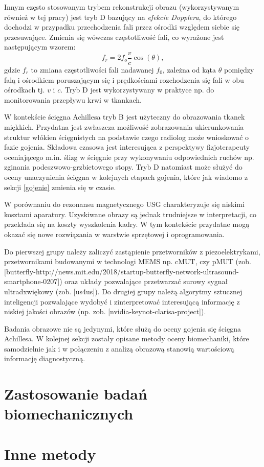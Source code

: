Innym często stosowanym trybem rekonstrukcji obrazu (wykorzystywanym również w tej pracy) jest tryb D bazujący na \textit{efekcie Dopplera}, do którego dochodzi w przypadku przechodzenia fali przez ośrodki względem siebie się przesuwające. Zmienia się wówczas częstotliwość fali, co wyrażone jest następującym wzorem:
\begin{equation}
f_r = 2 f_o\frac{v}{c}\cos(\theta),
\end{equation} 
gdzie $f_r$ to zmiana częstotliwości fali nadawanej $f_0$, zależna od kąta $\theta$ pomiędzy falą i ośrodkiem poruszającym się i prędkościami rozchodzenia się fali w obu ośrodkach tj. $v$ i $c$. Tryb D jest wykorzystywany w praktyce np. do monitorowania przepływu krwi w tkankach. 

W kontekście ścięgna Achillesa tryb B jest użyteczny do obrazowania tkanek miękkich. Przydatna jest zwłaszcza możliwość zobrazowania ukierunkowania struktur włókien ścięgnistych na podstawie czego radiolog może wnioskować o fazie gojenia. Składowa czasowa jest interesująca z perspektywy fizjoterapeuty oceniającego m.in. ślizg w ścięgnie przy wykonywaniu odpowiednich ruchów np. zginania podeszwowo-grzbietowego stopy. Tryb D natomiast może służyć do oceny unaczynienia ścięgna w kolejnych etapach gojenia, które jak wiadomo z sekcji \ref{gojenie} zmienia się w czasie.

W porównaniu do rezonansu magnetycznego USG charakteryzuje się niskimi kosztami aparatury. Uzyskiwane obrazy są jednak trudniejsze w interpretacji, co przekłada się na koszty wyszkolenia kadry. W tym kontekście przydatne mogą okazać się nowe rozwiązania w warstwie sprzętowej i oprogramowania. 

Do pierwszej grupy należy zaliczyć zastąpienie przetworników z piezoelektrykami, przetwornikami budowanymi w technologi MEMS np. cMUT, czy pMUT (zob. [butterfly-http://news.mit.edu/2018/startup-butterfly-network-ultrasound-smartphone-0207]) oraz układy pozwalające przetwarzać surowy sygnał ultradxwiękowy (zob. [us4us]). Do drugiej grupy należą algorytmy sztucznej inteligencji pozwalające wydobyć i zinterpretować interesującą informację z niskiej jakości obrazów (np. zob. [nvidia-keynot-clarisa-project]). 

Badania obrazowe nie są jedynymi, które służą do oceny gojenia się ścięgna Achillesa. W kolejnej sekcji zostały opisane metody oceny biomechaniki, które samodzielnie jak i w połączeniu z analizą obrazową stanowią wartościową informację diagnostyczną.

\section{Zastosowanie badań biomechanicznych}
\section{Inne metody}